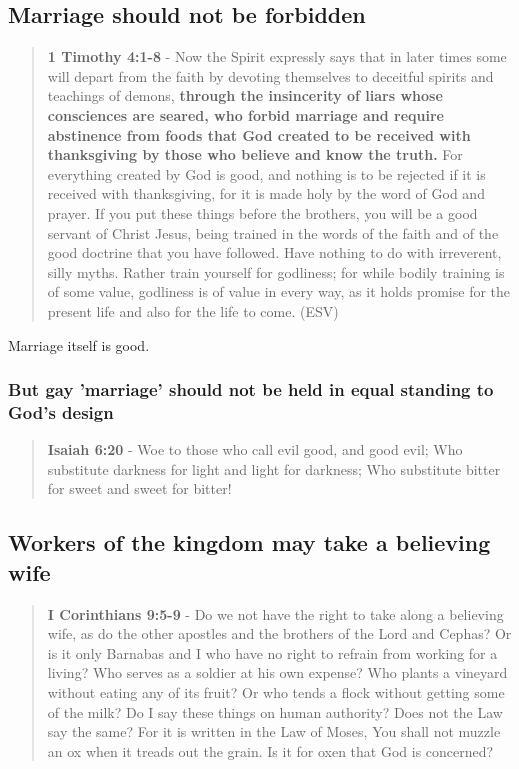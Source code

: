 \documentclass[11pt]{article}
\begin{document}
\subsection{Marriage should not be forbidden}
\label{sec:org801edb6}
\begin{quote}
\textbf{1 Timothy 4:1-8} - Now the Spirit expressly says that in later times some will depart from the faith by devoting themselves to deceitful spirits and teachings of demons, \textbf{through the insincerity of liars whose consciences are seared, who forbid marriage and require abstinence from foods that God created to be received with thanksgiving by those who believe and know the truth.} For everything created by God is good, and nothing is to be rejected if it is received with thanksgiving, for it is made holy by the word of God and prayer. If you put these things before the brothers, you will be a good servant of Christ Jesus, being trained in the words of the faith and of the good doctrine that you have followed. Have nothing to do with irreverent, silly myths. Rather train yourself for godliness; for while bodily training is of some value, godliness is of value in every way, as it holds promise for the present life and also for the life to come. (ESV)
\end{quote}

Marriage itself is good.

\subsubsection{But gay 'marriage' should not be held in equal standing to God's design}
\label{sec:org4c88587}

\begin{quote}
\textbf{Isaiah 6:20} - Woe to those who call evil good, and good evil; Who substitute darkness for light and light for darkness; Who substitute bitter for sweet and sweet for bitter!
\end{quote}

\subsection{Workers of the kingdom may take a believing wife}
\label{sec:orgdb39218}
\begin{quote}
\textbf{I Corinthians 9:5-9} - Do we not have the right to take along a believing wife, as do the other apostles and the brothers of the Lord and Cephas? Or is it only Barnabas and I who have no right to refrain from working for a living? Who serves as a soldier at his own expense? Who plants a vineyard without eating any of its fruit? Or who tends a flock without getting some of the milk? Do I say these things on human authority? Does not the Law say the same? For it is written in the Law of Moses, You shall not muzzle an ox when it treads out the grain. Is it for oxen that God is concerned?
\end{quote}
\end{document}
